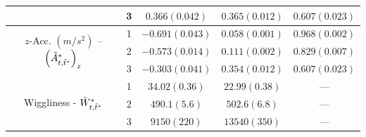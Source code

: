 \begin{table}[ht]
{\begin{tabular}{ccccc}
                                                                                       & 3                                    & $0.366 (0.042)$ & $0.365 (0.012)$ & $0.607 (0.023)$ \\ \hline
        \multirow{3}{*}{$z$-Acc. $(m/s^2)$ -- $\left(\tilde{A}^*_{t,\tilde t^*}\right)_z$}   & 1                                    & $-0.691 (0.043)$ & $0.058 (0.001)$ & $0.968 (0.002)$ \\
                                                                                       & 2                                    & $-0.573 (0.014)$ & $0.111 (0.002)$ & $0.829 (0.007)$ \\
                                                                                       & 3                                    & $-0.303 (0.041)$ & $0.354 (0.012)$ & $0.607 (0.023)$ \\ \hline
        \multirow{3}{*}{Wiggliness - $\tilde{W}^*_{t,\tilde t^*}$}                           & 1                                    & $34.02 (0.36)$ & $22.99 (0.38)$ & ---           \\
                                                                                       & 2                                    & $490.1 (5.6)$ & $502.6 (6.8)$ & ---           \\
                                                                                       & 3                                    & $9150 (220)$ & $13540 (350)$ & ---           \\ \hline
    \end{tabular}
    }
    \label{table:emis_dists_CarHHMM-DFT}
\end{table}

